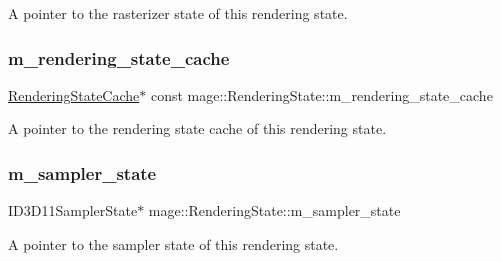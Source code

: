 A pointer to the rasterizer state of this rendering state. \hypertarget{structmage_1_1_rendering_state_a8d422a14392f89eec1ece2d917511168}{}\label{structmage_1_1_rendering_state_a8d422a14392f89eec1ece2d917511168} 
\subsubsection{\texorpdfstring{m\+\_\+rendering\+\_\+state\+\_\+cache}{m\_rendering\_state\_cache}}
{\footnotesize\ttfamily \hyperlink{structmage_1_1_rendering_state_cache}{Rendering\+State\+Cache}$\ast$ const mage\+::\+Rendering\+State\+::m\+\_\+rendering\+\_\+state\+\_\+cache\hspace{0.3cm}{\ttfamily [private]}}

A pointer to the rendering state cache of this rendering state. \hypertarget{structmage_1_1_rendering_state_a88c58f587b9670d662aef5a3a52fa38d}{}\label{structmage_1_1_rendering_state_a88c58f587b9670d662aef5a3a52fa38d} 
\subsubsection{\texorpdfstring{m\+\_\+sampler\+\_\+state}{m\_sampler\_state}}
{\footnotesize\ttfamily I\+D3\+D11\+Sampler\+State$\ast$ mage\+::\+Rendering\+State\+::m\+\_\+sampler\+\_\+state\hspace{0.3cm}{\ttfamily [private]}}

A pointer to the sampler state of this rendering state. 